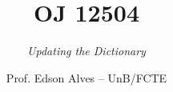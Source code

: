 \title{OJ 12504}
\subtitle{\textit{Updating the Dictionary}}
\author{Prof. Edson Alves -- UnB/FCTE}
\date{}
